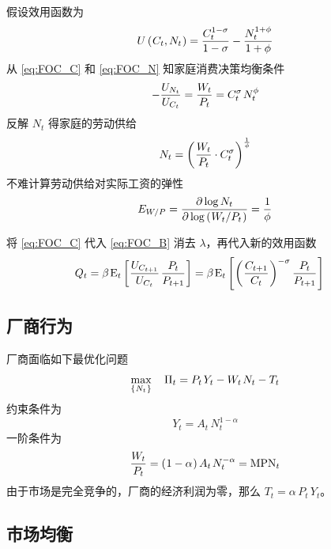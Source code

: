 假设效用函数为
\begin{equation*}
    U\left(\mspace{1mu} C_t,N_t\mspace{1mu}\right)=\dfrac{C_t^{1-\sigma}}{1-\sigma}-\dfrac{N_t^{1+\phi}}{1+\phi}
\end{equation*}
从 \ref{eq:FOC_C} 和 \ref{eq:FOC_N} 知家庭消费决策均衡条件
\begin{align}    
    -\dfrac{U_{N_t}}{U_{C_t}}=\dfrac{W_t}{P_t}=C_t^\sigma\,N^\phi_t\notag
\end{align}
反解 \(N_t\) 得家庭的劳动供给
\begin{align}
    N_t=\left(\mspace{1mu}\dfrac{W_t}{P_t}\cdot C_t^\sigma\mspace{1mu}\right)^{\frac{1}{\phi}}\notag
\end{align}
不难计算劳动供给对实际工资的弹性
\begin{align*}
    E_{W/P}=\dfrac{\partial\operatorname{log} N_t}{\partial \operatorname{log} \left(\mspace{1mu} W_t/P_t\mspace{1mu}\right)}=\dfrac1\phi
\end{align*}

将 \ref{eq:FOC_C} 代入 \ref{eq:FOC_B} 消去 \(\lambda\)，再代入新的效用函数
\begin{align}
    Q_t&=\beta\,\meant\bks{\dfrac{U_{C_{t+1}}}{U_{C_t}}\,\dfrac{P_t}{P_{t+1}}}=\beta\,\meant\bks{\bka{\dfrac{C_{t+1}}{C_t}}^{-\sigma}\dfrac{P_t}{P_{t+1}}}\notag
\end{align}

\subsection{厂商行为}

厂商面临如下最优化问题
\begin{equation*}
    \max_{\bkd{N_t}} \quad \Pi_t=P_t\,Y_t-W_t\,N_t-T_t
\end{equation*}
约束条件为
\begin{equation*}
    Y_t=A_t\,N^{1-\alpha}_t
\end{equation*}
一阶条件为
\begin{equation*}
    \dfrac{W_t}{P_t}=\bka{1-\alpha}A_t\,N^{-\alpha}_t=\n{MPN}_t
\end{equation*}
由于市场是完全竞争的，厂商的经济利润为零，那么 \(T_t=\alpha\,P_t\,Y_t\)。

\subsection{市场均衡}

